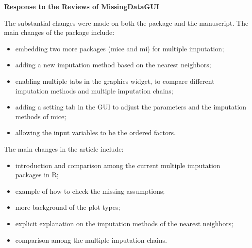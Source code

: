 \documentclass[12pt,english]{article}
\begin{document}
\begin{center}
\textbf{\LARGE{Response to the Reviews of MissingDataGUI}}
\bigskip{}
\par\end{center}{\LARGE \par}

The substantial changes were made on both the package and the manuscript.
The main changes of the package include:

\begin{itemize}
\item embedding two more packages (mice and mi) for multiple imputation;
\item adding a new imputation method based on the nearest neighbors;
\item enabling multiple tabs in the graphics widget, to compare different
imputation methods and multiple imputation chains;
\item adding a setting tab in the GUI to adjust the parameters and the imputation
methods of mice;
\item allowing the input variables to be the ordered factors.
\end{itemize}

The main changes in the article include:
\begin{itemize}
\item introduction and comparison among the current multiple imputation
packages in R;
\item example of how to check the missing assumptions;
\item more background of the plot types;
\item explicit explanation on the imputation methods of the nearest neighbors;
\item comparison among the multiple imputation chains.
\end{itemize}
\clearpage{}
\end{document}

